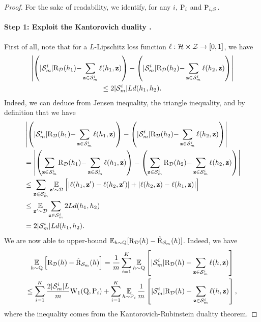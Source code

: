 \begin{noaddcontents}
    \theoremsupervisednnl*
    \begin{proof}
    For the sake of readability, we identify, for any $i$, $\P_i $ and $\P_{i,\S}$.
    \paragraph{Step 1: Exploit the Kantorovich duality \cite[Remark 6.5]{villani2009optimal}.}
    First of all, note that for a $L$-Lipschitz loss function $\loss: \H\times\Z\to[0,1]$, we have
    \begin{multline}
    \LN\LP |\Sm^{i}|\Risk_{\D}(h_1){-}\sum_{\z\in\Sm^{i}}\loss(h_1, \z)\RP - \LP |\Sm^{i}|\Risk_{\D}(h_2){-}\sum_{\z\in\Sm^{i}}\loss(h_2, \z)\RP\right\vert \\ \le 2|\Sm^{i}|Ld(h_1, h_2).\label{eq:proof-supervised-1}
    \end{multline}
    Indeed, we can deduce  from Jensen inequality, the triangle inequality, and by definition that we have
    \begin{align*}
    &\LN\LP |\Sm^{i}|\Risk_{\D}(h_1){-}\sum_{\z\in\Sm^{i}}\loss(h_1, \z)\RP - \LP |\Sm^{i}|\Risk_{\D}(h_2){-}\sum_{\z\in\Sm^{i}}\loss(h_2, \z)\RP\right\vert\\
    &= \LN\LP\sum_{\z\in\Sm^{i}}\Risk_{\D}(h_1){-}\sum_{\z\in\Sm^{i}}\loss(h_1, \z)\RP - \LP\sum_{\z\in\Sm^{i}}\Risk_{\D}(h_2){-}\sum_{\z\in\Sm^{i}}\loss(h_2, \z)\RP\right\vert\\
    &\le \sum_{\z\in\Sm^{i}}\EE_{\z'\sim\D}\Big[ |\loss(h_1, \z')-\loss(h_2, \z')|+|\loss(h_2, \z)-\loss(h_1, \z)|\Big]\\
    &\le \EE_{\z'\sim\D}\sum_{\z\in\Sm^{i}} 2Ld(h_1, h_2)\\
    &= 2|\Sm^{i}|Ld(h_1, h_2).
    \end{align*}
    We are now able to upper-bound $\EE_{h\sim\Q}[ \Risk_{\D}(h) - \Riskhat_{\Sm}(h) ]$. 
    Indeed, we have
    \begin{multline}
    \EE_{h\sim\Q}\Big[ \Risk_{\D}(h) - \Riskhat_{\Sm}(h) \Big] = \frac{1}{m}\sum_{i=1}^{K} \EE_{h\sim\Q}\LB |\Sm^{i}|\Risk_{\D}(h) - \sum_{\z\in\Sm^{i}}\loss(h, \z) \RB \\ \le \sum_{i=1}^{K} \frac{2|\Sm^{i}|L}{m}\W_{1}(\Q, \P_i) + \sum_{i=1}^{K} \EE_{h\sim\P_i} \frac{1}{m}\LB |\Sm^{i}|\Risk_{\D}(h) - \sum_{\z\in\Sm^{i}} \loss(h, \z) \RB,\label{eq:proof-supervised-2}
    \end{multline}
    where the inequality comes from the Kantorovich-Rubinstein duality theorem.
    

\end{proof}
\end{noaddcontents}
